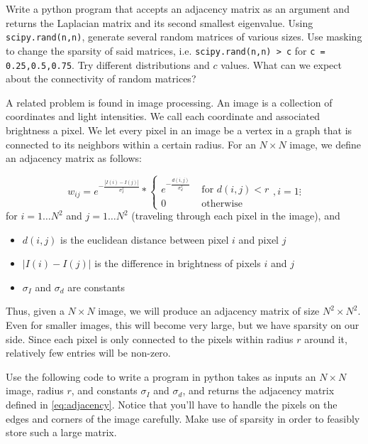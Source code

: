 \begin{problem}Write a python program that accepts an adjacency matrix as an argument and returns the Laplacian matrix and its second smallest eigenvalue.  Using {\tt scipy.rand(n,n)}, generate several random matrices of various sizes.  Use masking to change the sparsity of said matrices, i.e. {\tt scipy.rand(n,n) > c} for {\tt c = 0.25,0.5,0.75}.  Try different distributions and $c$ values.  What can we expect about the connectivity of random matrices?
\end{problem}

A related problem is found in image processing.  An image is a collection of coordinates and light intensities.  We call each coordinate and associated brightness a pixel. We let every pixel in an image be a vertex in a graph that is connected to its neighbors within a certain radius.  For an $N \times N$ image, we define an adjacency matrix as follows:

\begin{equation}
\label{eq:adjacency}
w_{ij} = e^{-\frac{|I(i) - I(j)|}{\sigma_I^2}} * \begin{cases} e^{-\frac{d(i,j)}{\sigma_d^2}} & \mbox{ for $d(i,j) < r$} \\ 0 & \mbox{ otherwise} \end{cases}, i = 1 \vdots
\end{equation}
for $i = 1 \hdots N^2$ and $j = 1 \hdots N^2$ (traveling through each pixel in the image), and 
\begin{itemize}
	\item$d(i,j)$ is the euclidean distance between pixel $i$ and pixel $j$ 
	\item $|I(i) - I(j)|$ is the difference in brightness of pixels $i$ and $j$
	\item $\sigma_I$ and $\sigma_d$ are constants
\end{itemize} 
Thus, given a $N\times N$ image, we will produce an adjacency matrix of size $N^2\times N^2$.  Even for smaller images, this will become very large, but we have sparsity on our side.  Since each pixel is only connected to the pixels within radius $r$ around it, relatively few entries will be non-zero.

\begin{problem}  Use the following code to write a program in python takes as inputs an $N \times N$ image, radius $r$, and constants $\sigma_I$ and $\sigma_d$, and returns the adjacency matrix defined in \eqref{eq:adjacency}.  Notice that you'll have to handle the pixels on the edges and corners of the image carefully. Make use of sparsity in order to feasibly store such a large matrix.
\end{problem}

